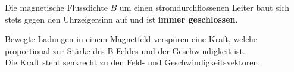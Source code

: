 	\beginip
	Die magnetische Flussdichte $B$ um einen stromdurchflossenen Leiter baut sich stets gegen den Uhrzeigersinn auf und ist \textbf{immer geschlossen}. \\
	\begin{center}
	\end{center}
	\iend

 \newpage
	\begingl
	Bewegte Ladungen in einem Magnetfeld verspüren eine Kraft, welche proportional zur Stärke des B-Feldes und der Geschwindigkeit ist. \\
	Die Kraft steht senkrecht zu den Feld- und Geschwindigkeitsvektoren.


	\begin{center}
	\end{center}

